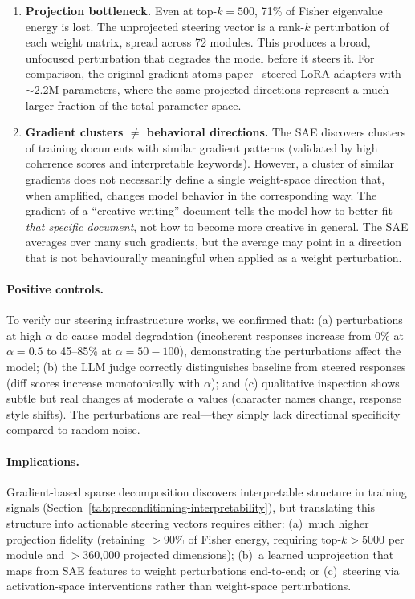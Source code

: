 \begin{enumerate}
\item \textbf{Projection bottleneck.} Even at top-$k{=}500$, 71\% of Fisher eigenvalue energy is lost. The unprojected steering vector is a rank-$k$ perturbation of each weight matrix, spread across 72 modules. This produces a broad, unfocused perturbation that degrades the model before it steers it. For comparison, the original gradient atoms paper~\citep{rosser2025gradient} steered LoRA adapters with ${\sim}2.2$M parameters, where the same projected directions represent a much larger fraction of the total parameter space.

\item \textbf{Gradient clusters $\neq$ behavioral directions.} The SAE discovers clusters of training documents with similar gradient patterns (validated by high coherence scores and interpretable keywords). However, a cluster of similar gradients does not necessarily define a single weight-space direction that, when amplified, changes model behavior in the corresponding way. The gradient of a ``creative writing'' document tells the model how to better fit \emph{that specific document}, not how to become more creative in general. The SAE averages over many such gradients, but the average may point in a direction that is not behaviourally meaningful when applied as a weight perturbation.
\end{enumerate}

\paragraph{Positive controls.} To verify our steering infrastructure works, we confirmed that: (a) perturbations at high $\alpha$ do cause model degradation (incoherent responses increase from 0\% at $\alpha{=}0.5$ to 45--85\% at $\alpha{=}50{-}100$), demonstrating the perturbations affect the model; (b) the LLM judge correctly distinguishes baseline from steered responses (diff scores increase monotonically with $\alpha$); and (c) qualitative inspection shows subtle but real changes at moderate $\alpha$ values (character names change, response style shifts). The perturbations are real---they simply lack directional specificity compared to random noise.

\paragraph{Implications.} Gradient-based sparse decomposition discovers interpretable structure in training signals (Section~\ref{tab:preconditioning-interpretability}), but translating this structure into actionable steering vectors requires either: (a)~much higher projection fidelity (retaining $>$90\% of Fisher energy, requiring top-$k{>}5000$ per module and $>$360{,}000 projected dimensions); (b)~a learned unprojection that maps from SAE features to weight perturbations end-to-end; or (c)~steering via activation-space interventions rather than weight-space perturbations.
